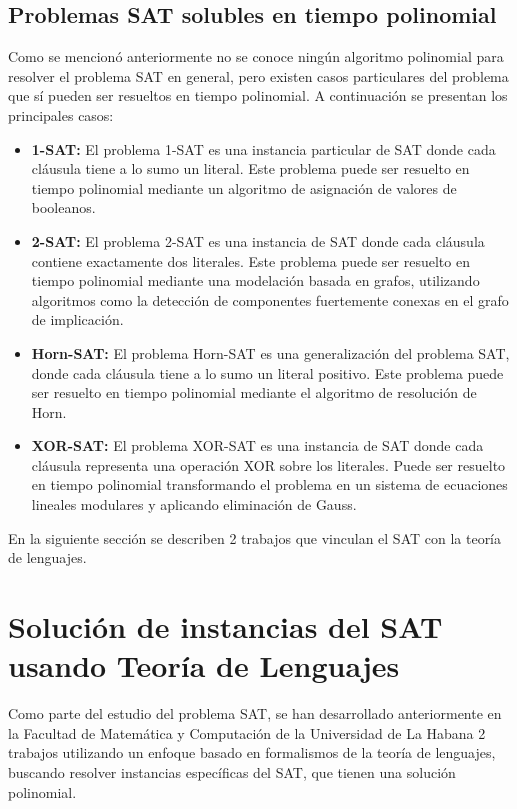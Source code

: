 \documentclass[12pt]{article}
\begin{document}
\subsection{Problemas SAT solubles en tiempo polinomial}

Como se mencionó anteriormente no se conoce ningún algoritmo polinomial para resolver el problema SAT en general, pero
existen casos particulares del problema que sí pueden ser resueltos en tiempo polinomial. A continuación se presentan los
principales casos:

\begin{itemize}
  \item \textbf{1-SAT:} El problema 1-SAT es una instancia particular de SAT donde cada cláusula tiene a lo sumo un literal.
        Este problema puede ser resuelto en tiempo polinomial mediante un algoritmo de asignación de valores de booleanos.
        
  \item \textbf{2-SAT:} El problema 2-SAT es una instancia de SAT donde cada cláusula contiene exactamente dos literales.
        Este problema puede ser resuelto en tiempo polinomial mediante una modelación basada en grafos, 
        utilizando algoritmos como la detección de componentes fuertemente conexas en el grafo de implicación.
        
  \item \textbf{Horn-SAT:} El problema Horn-SAT es una generalización del problema SAT,
        donde cada cláusula tiene a lo sumo un literal positivo. 
        Este problema puede ser resuelto en tiempo polinomial mediante el algoritmo de resolución de Horn.
        
  \item \textbf{XOR-SAT:} El problema XOR-SAT es una instancia de SAT donde cada cláusula representa una operación XOR
        sobre los literales. Puede ser resuelto en tiempo polinomial transformando el problema en un sistema de ecuaciones 
        lineales modulares y aplicando eliminación de Gauss.
\end{itemize}

En la siguiente sección se describen 2 trabajos que vinculan el SAT con la teoría de lenguajes.

\section{Solución de instancias del SAT usando Teoría de Lenguajes}

Como parte del estudio del problema SAT, se han desarrollado anteriormente en 
la Facultad de Matemática y Computación de la Universidad de La Habana 
2 trabajos utilizando un enfoque 
basado en formalismos de la teoría de lenguajes, buscando resolver 
instancias específicas del SAT, que tienen una solución polinomial. 
\end{document}
